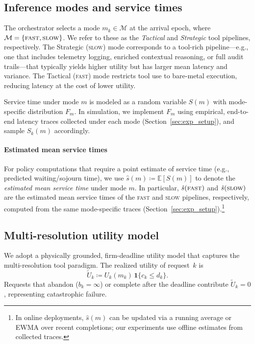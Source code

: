 \documentclass[preprint,12pt]{elsarticle}
\begin{document}
\subsection{Inference modes and service times}
\label{sec:modes_service}

The orchestrator selects a mode $m_k \in \mathcal{M}$ at the arrival epoch, where $\mathcal{M}=\{\textsc{fast},\textsc{slow}\}$. We refer to these as the \emph{Tactical} and \emph{Strategic} tool pipelines, respectively. The Strategic (\textsc{slow}) mode corresponds to a tool-rich pipeline---e.g., one that includes telemetry logging, enriched contextual reasoning, or full audit trails---that typically yields higher utility but has larger mean latency and variance. The Tactical (\textsc{fast}) mode restricts tool use to bare-metal execution, reducing latency at the cost of lower utility.

Service time under mode $m$ is modeled as a random variable $S(m)$ with mode-specific distribution $F_m$. In simulation, we implement $F_m$ using empirical, end-to-end latency traces collected under each mode (Section~\ref{sec:exp_setup}), and sample $S_k(m)$ accordingly.

\paragraph{Estimated mean service times}
For policy computations that require a point estimate of service time (e.g., predicted waiting/sojourn time), we use
$\hat{s}(m) \coloneqq \mathbb{E}[S(m)]$ to denote the \emph{estimated mean service time} under mode $m$.
In particular, $\hat{s}(\textsc{fast})$ and $\hat{s}(\textsc{slow})$ are the estimated mean service times of the \textsc{fast} and \textsc{slow} pipelines, respectively, computed from the same mode-specific traces (Section~\ref{sec:exp_setup}).\footnote{In online deployments, $\hat{s}(m)$ can be updated via a running average or EWMA over recent completions; our experiments use offline estimates from collected traces.}

\subsection{Multi-resolution utility model}
\label{sec:utility_model}

We adopt a physically grounded, firm-deadline utility model that captures the multi-resolution tool paradigm. The realized utility of request~$k$ is
\begin{equation}
\tilde{U}_k \coloneqq U_k(m_k)\,\mathbf{1}\{c_k \le d_k\}.
\label{eq:on_time_utility_model}
\end{equation}
Requests that abandon ($b_k=\infty$) or complete after the deadline contribute $\tilde{U}_k=0$, representing catastrophic failure.
\end{document}
